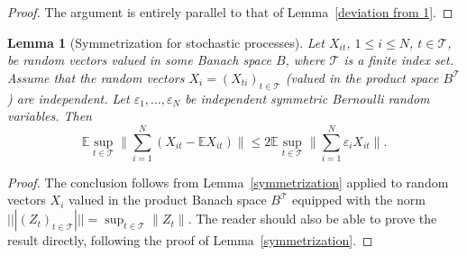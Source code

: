 \documentclass[10pt, openany]{book}
\newtheorem{lemma}[theorem]{Lemma}
\theoremstyle{remark}
\def \E {\mathbb{E}}
\def \TT {\mathcal{T}}
\def \e {\varepsilon}
\begin{document}
\begin{proof}
The argument is entirely parallel to that of Lemma~\ref{deviation from 1}. 
\end{proof}

\begin{lemma}[Symmetrization for stochastic processes]	 		\label{symmetrization uniform}
  Let $X_{it}$, $1 \le i \le N$, $t \in \TT$, be random vectors valued in some Banach space $B$,
  where $\TT$ is a finite index set. Assume that the random vectors $X_i = (X_{ti})_{t \in \TT}$ 
  (valued in the product space $B^\TT$) are independent.
  Let $\e_1,\ldots, \e_N$ be independent symmetric Bernoulli random variables. 
  Then 
  $$ 
  \E \sup_{t \in \TT} \Big\| \sum_{i=1}^N (X_{it} - \E X_{it}) \Big\|
  \le 2 \E \sup_{t \in \TT} \Big\| \sum_{i=1}^N \e_i X_{it} \Big\|.
  $$
\end{lemma}

\begin{proof}
The conclusion follows from Lemma~\ref{symmetrization} applied to random vectors
$X_i$ valued in the product Banach space $B^\TT$ equipped with the norm
$||| (Z_t)_{t \in \TT} ||| = \sup_{t \in \TT} \|Z_t\|$.
The reader should also be able to prove the result directly, following the proof 
of Lemma~\ref{symmetrization}.
\end{proof}
\end{document}
